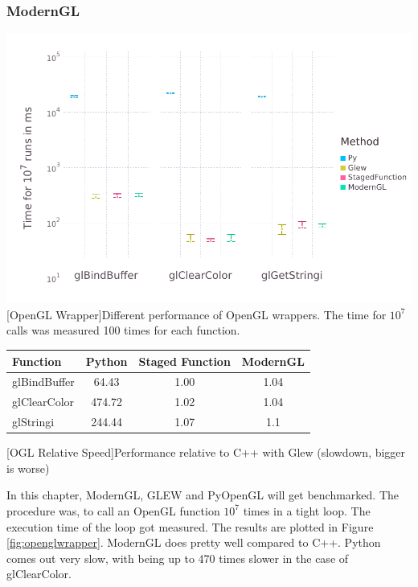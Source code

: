 \subsubsection{ModernGL}
\vspace{1em}
\begin{minipage}{\linewidth}
    \centering
    \includegraphics[width=0.9\linewidth]{graphics/glbench.pdf}
    [OpenGL Wrapper]{Different performance of OpenGL wrappers. The time for $10^7$ calls was measured 100 times for each function.}
    \label{fig:openglwrapper}
\end{minipage}
\begin{table}[htbp]
    \centering
    \begin{tabular}{l|c|c|c}
        \hline
        \textbf{Function}   & \textbf{Python}    & \textbf{Staged Function} & \textbf{ModernGL} \\
        \hline
        glBindBuffer        & 64.43              & 1.00 & 1.04 \\
        glClearColor        & 474.72             & 1.02 & 1.04 \\
        glStringi           & 244.44             & 1.07 & 1.1  \\
    \end{tabular}
    [OGL Relative Speed]{Performance relative to C++ with Glew (slowdown, bigger is worse)}
    \label{table:relativespeedoglw}
\end{table}

In this chapter, ModernGL, GLEW and PyOpenGL will get benchmarked.
The procedure was, to call an OpenGL function $10^7$ times in a tight loop. The execution time of the loop got measured.
The results are plotted in Figure \ref{fig:openglwrapper}.
ModernGL does pretty well compared to C++. Python comes out very slow, with being up to 470 times slower in the case of glClearColor.

